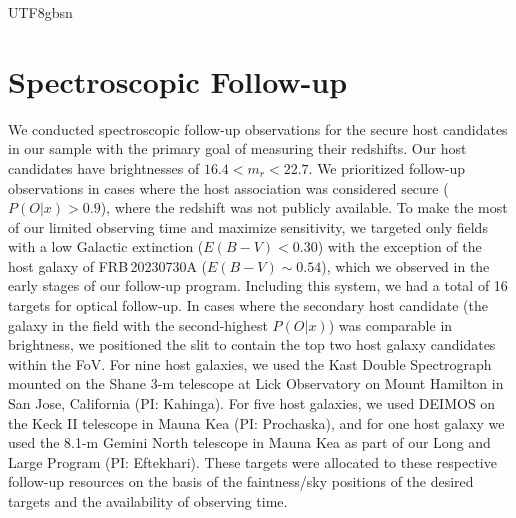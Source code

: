 \documentclass[twocolumn,linenumbers]{aastex631}
\begin{document}
\begin{CJK*}{UTF8}{gbsn}


\section{Spectroscopic Follow-up}\label{sec:followup}
We conducted spectroscopic follow-up observations for the secure host candidates in our sample with the primary goal of measuring their redshifts. Our host candidates have brightnesses of $16.4 < m_r < 22.7$. We prioritized follow-up observations in cases where the host association was considered secure ($P(O|x) > 0.9$), where the redshift was not publicly available. To make the most of our limited observing time and maximize sensitivity, we targeted only fields with a low Galactic extinction ($E(B-V) < 0.30$) with the exception of the host galaxy of FRB\,20230730A ($E(B-V) \sim 0.54$), which we observed in the early stages of our follow-up program. Including this system, we had a total of 16 targets for optical follow-up. In cases where the secondary host candidate (the galaxy in the field with the second-highest $P(O|x)$) was comparable in brightness, we positioned the slit to contain the top two host galaxy candidates within the FoV. For nine host galaxies, we used the Kast Double Spectrograph mounted on the Shane 3-m telescope at Lick Observatory on Mount Hamilton in San Jose, California (PI: Kahinga). For five host galaxies, we used DEIMOS on the Keck II telescope in Mauna Kea (PI: Prochaska), and for one host galaxy we used the 8.1-m Gemini North telescope in Mauna Kea as part of our Long and Large Program (PI: Eftekhari). These targets were allocated to these respective follow-up resources on the basis of the faintness/sky positions of the desired targets and the availability of observing time.


\end{CJK*}
\end{document}
